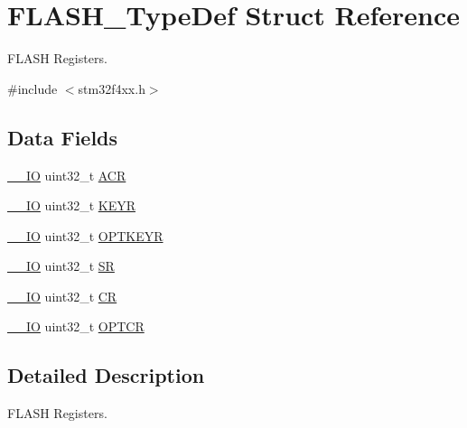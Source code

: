 \hypertarget{struct_f_l_a_s_h___type_def}{}\section{F\+L\+A\+S\+H\+\_\+\+Type\+Def Struct Reference}
\label{struct_f_l_a_s_h___type_def}


F\+L\+A\+SH Registers.  




{\ttfamily \#include $<$stm32f4xx.\+h$>$}

\subsection*{Data Fields}
\begin{DoxyCompactItemize}
\item 
\hyperlink{group___c_m_s_i_s__core__definitions_gaec43007d9998a0a0e01faede4133d6be}{\+\_\+\+\_\+\+IO} uint32\+\_\+t \hyperlink{struct_f_l_a_s_h___type_def_a9cb55206b29a8c16354747c556ab8bea}{A\+CR}
\item 
\hyperlink{group___c_m_s_i_s__core__definitions_gaec43007d9998a0a0e01faede4133d6be}{\+\_\+\+\_\+\+IO} uint32\+\_\+t \hyperlink{struct_f_l_a_s_h___type_def_a84c491be6c66b1d5b6a2efd0740b3d0c}{K\+E\+YR}
\item 
\hyperlink{group___c_m_s_i_s__core__definitions_gaec43007d9998a0a0e01faede4133d6be}{\+\_\+\+\_\+\+IO} uint32\+\_\+t \hyperlink{struct_f_l_a_s_h___type_def_afc4900646681dfe1ca43133d376c4423}{O\+P\+T\+K\+E\+YR}
\item 
\hyperlink{group___c_m_s_i_s__core__definitions_gaec43007d9998a0a0e01faede4133d6be}{\+\_\+\+\_\+\+IO} uint32\+\_\+t \hyperlink{struct_f_l_a_s_h___type_def_af6aca2bbd40c0fb6df7c3aebe224a360}{SR}
\item 
\hyperlink{group___c_m_s_i_s__core__definitions_gaec43007d9998a0a0e01faede4133d6be}{\+\_\+\+\_\+\+IO} uint32\+\_\+t \hyperlink{struct_f_l_a_s_h___type_def_ab40c89c59391aaa9d9a8ec011dd0907a}{CR}
\item 
\hyperlink{group___c_m_s_i_s__core__definitions_gaec43007d9998a0a0e01faede4133d6be}{\+\_\+\+\_\+\+IO} uint32\+\_\+t \hyperlink{struct_f_l_a_s_h___type_def_acfef9b6d7da4271943edc04d7dfdf595}{O\+P\+T\+CR}
\end{DoxyCompactItemize}


\subsection{Detailed Description}
F\+L\+A\+SH Registers. 

